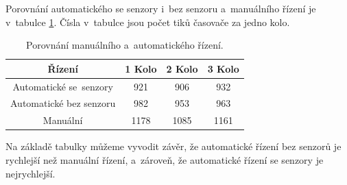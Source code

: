 Porovnání automatického se senzory i~bez senzoru a~manuálního řízení je v~tabulce 
\ref{tab:Comparison}. Čísla v~tabulce jsou počet tiků časovače za jedno kolo.
\begin{table}[!h]
    \centering
    \begin{tabular}{cccc}
        \hline
        \textbf{Řízení} & \textbf{1 Kolo} & \textbf{2 Kolo} & \textbf{3 Kolo} \\
        \hline
        Automatické se~senzory          & 921       & 906 & 932          \\
        Automatické bez senzoru & 982 & 953 & 963 \\
        Manuální 			  & 1178       & 1085 & 1161           \\
        \hline
    \end{tabular}
    \caption{Porovnání manuálního a~automatického řízení.}
    \label{tab:Comparison}
\end{table}

Na základě tabulky můžeme vyvodit závěr, že automatické řízení bez senzorů je 
rychlejší než manuální řízení, a~zároveň, že automatické řízení se senzory je 
nejrychlejší.

\endinput